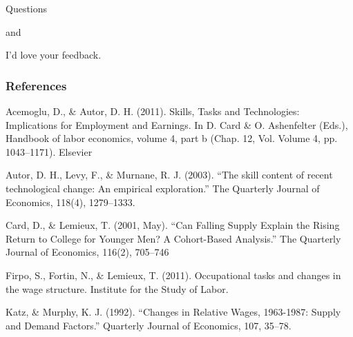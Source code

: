 \documentclass[red]{beamer}
\begin{document}
\begin{frame}
  \begin{center}
    Questions
    \vspace{1cm}

    and
    \vspace{1cm}

    I'd love your feedback.
  \end{center}
\end{frame}

\begin{frame}
\frametitle{References}
{ \scriptsize
Acemoglu, D., \& Autor, D. H. (2011). Skills, Tasks and Technologies: Implications for Employment and Earnings. In D. Card \& O. Ashenfelter (Eds.), Handbook of labor economics, volume 4, part b (Chap. 12, Vol. Volume 4, pp. 1043–1171). Elsevier
\vfill

Autor, D. H., Levy, F., \& Murnane, R. J. (2003). “The skill content of recent technological change: An empirical exploration.” The Quarterly Journal of Economics, 118(4), 1279–1333.
\vfill

Card, D., \& Lemieux, T. (2001, May). “Can Falling Supply Explain the Rising Return to College for Younger Men? A Cohort-Based Analysis.” The Quarterly Journal of Economics, 116(2), 705–746
\vfill

Firpo, S., Fortin, N., \& Lemieux, T. (2011). Occupational tasks and changes in the wage structure. Institute for the Study of Labor.
\vfill

Katz, \& Murphy, K. J. (1992). “Changes in Relative Wages, 1963-1987: Supply and Demand Factors.” Quarterly Journal of Economics, 107, 35–78.
}
\end{frame}

\end{document}
